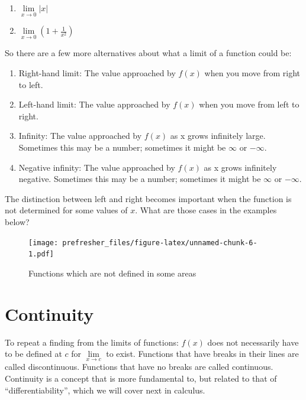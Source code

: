 \documentclass[]{book}
\providecommand{\tightlist}{%
  \setlength{\itemsep}{0pt}\setlength{\parskip}{0pt}}
\theoremstyle{definition}
\theoremstyle{definition}
\theoremstyle{definition}
\theoremstyle{remark}
\begin{document}
\begin{enumerate}
\def\labelenumi{\arabic{enumi}.}
\tightlist
\item
  \(\lim\limits_{x\to 0} |x|\)
\item
  \(\lim\limits_{x\to 0} \left(1+\frac{1}{x^2}\right)\)
\end{enumerate}

So there are a few more alternatives about what a limit of a function
could be:

\begin{enumerate}
\def\labelenumi{\arabic{enumi}.}
\tightlist
\item
  Right-hand limit: The value approached by \(f(x)\) when you move from
  right to left.
\item
  Left-hand limit: The value approached by \(f(x)\) when you move from
  left to right.
\item
  Infinity: The value approached by \(f(x)\) as x grows infinitely
  large. Sometimes this may be a number; sometimes it might be
  \(\infty\) or \(-\infty\).
\item
  Negative infinity: The value approached by \(f(x)\) as x grows
  infinitely negative. Sometimes this may be a number; sometimes it
  might be \(\infty\) or \(-\infty\).
\end{enumerate}

The distinction between left and right becomes important when the
function is not determined for some values of \(x\). What are those
cases in the examples below?

\begin{figure}
\centering
\texttt{[image: prefresher\_files/figure-latex/unnamed-chunk-6-1.pdf]}
\caption{\label{fig:unnamed-chunk-6}Functions which are not defined in some
areas}
\end{figure}

\section{Continuity}\label{continuity}

To repeat a finding from the limits of functions: \(f(x)\) does not
necessarily have to be defined at \(c\) for \(\lim\limits_{x \to c}\) to
exist. Functions that have breaks in their lines are called
discontinuous. Functions that have no breaks are called continuous.
Continuity is a concept that is more fundamental to, but related to that
of ``differentiability'', which we will cover next in calculus.
\end{document}
